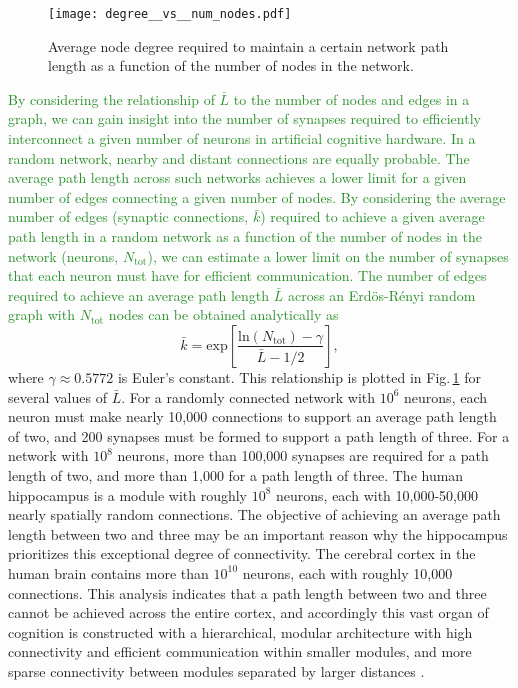 \documentclass[twocolumn]{article}
\begin{document}
\begin{figure}
    \centering
    \texttt{[image: degree\_\_vs\_\_num\_nodes.pdf]} %
    \caption{Average node degree required to maintain a certain network path length as a function of the number of nodes in the network.}
    \label{fig:degree_vs_num_nodes}
\end{figure}
\textcolor{ForestGreen}{By considering the relationship of $\bar{L}$ to the number of nodes and edges in a graph, we can gain insight into the number of synapses required to efficiently interconnect a given number of neurons in artificial cognitive hardware. In a random network, nearby and distant connections are equally probable. The average path length across such networks achieves a lower limit for a given number of edges connecting a given number of nodes. By considering the average number of edges (synaptic connections, $\bar{k}$) required to achieve a given average path length in a random network as a function of the number of nodes in the network (neurons, $N_{\mathrm{tot}}$), we can estimate a lower limit on the number of synapses that each neuron must have for efficient communication. The number of edges required to achieve an average path length $\bar{L}$ across an Erd\"{o}s-R\'{e}nyi random graph with $N_{\mathrm{tot}}$ nodes can be obtained analytically as \cite{frfr2004}}
\begin{equation}
\label{eq:degree}
\bar{k} = \mathrm{exp} \left[ \frac{\mathrm{ln}(N_{\mathrm{tot}})-\gamma}{\bar{L}-1/2} \right],
\end{equation}
where $\gamma \approx 0.5772$ is Euler's constant. This relationship is plotted in Fig.\,\ref{fig:degree_vs_num_nodes} for several values of $\bar{L}$. For a randomly connected network with $10^6$ neurons, each neuron must make nearly 10,000 connections to support an average path length of two, and 200 synapses must be formed to support a path length of three. For a network with $10^8$ neurons, more than 100,000 synapses are required for a path length of two, and more than 1,000 for a path length of three. The human hippocampus is a module with roughly $10^8$ neurons, each with 10,000-50,000 nearly spatially random connections. The objective of achieving an average path length between two and three may be an important reason why the hippocampus prioritizes this exceptional degree of connectivity. The cerebral cortex in the human brain contains more than $10^{10}$ neurons, each with roughly 10,000 connections. This analysis indicates that a path length between two and three cannot be achieved across the entire cortex, and accordingly this vast organ of cognition is constructed with a hierarchical, modular architecture \cite{si1962,ne2006} with high connectivity and efficient communication within smaller modules, and more sparse connectivity between modules separated by larger distances \cite{mo1997,mela2009,bosp2015,beba2017}.
\end{document}
